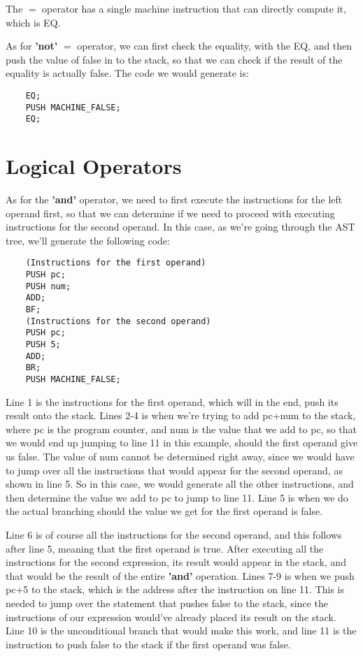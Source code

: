 \documentclass{article}
\begin{document}
The $=$ operator has a single machine instruction that can directly compute it, which is EQ.

As for \textbf{'not'} $=$ operator, we can first check the equality, with the EQ, and then push the value of false in to the stack, so that we can check if the result of the equality is actually false. The code we would generate is:

\begin{lstlisting}
    EQ;
    PUSH MACHINE_FALSE;
    EQ;
\end{lstlisting}

\section{Logical Operators}

As for the \textbf{'and'} operator, we need to first execute the instructions for the left operand first, so that we can determine if we need to proceed with executing instructions for the second operand. In this case, as we're going through the AST tree, we'll generate the following code:

\begin{lstlisting}
    (Instructions for the first operand)
    PUSH pc;
    PUSH num;
    ADD;
    BF;
    (Instructions for the second operand)
    PUSH pc;
    PUSH 5;
    ADD;
    BR;
    PUSH MACHINE_FALSE;
\end{lstlisting}

Line 1 is the instructions for the first operand, which will in the end, push its result onto the stack. Lines 2-4 is when we're trying to add pc+num to the stack, where pc is the program counter, and num is the value that we add to pc, so that we would end up jumping to line 11 in this example, should the first operand give us false. The value of num cannot be determined right away, since we would have to jump over all the instructions that would appear for the second operand, as shown in line 5. So in this case, we would generate all the other instructions, and then determine the value we add to pc to jump to line 11. Line 5 is when we do the actual branching should the value we get for the first operand is false.

Line 6 is of course all the instructions for the second operand, and this follows after line 5, meaning that the first operand is true. After executing all the instructions for the second expression, its result would appear in the stack, and that would be the result of the entire \textbf{'and'} operation. Lines 7-9 is when we push pc+5 to the stack, which is the address after the instruction on line 11. This is needed to jump over the statement that pushes false to the stack, since the instructions of our expression would've already placed its result on the stack. Line 10 is the unconditional branch that would make this work, and line 11 is the instruction to push false to the stack if the first operand was false.
\end{document}
